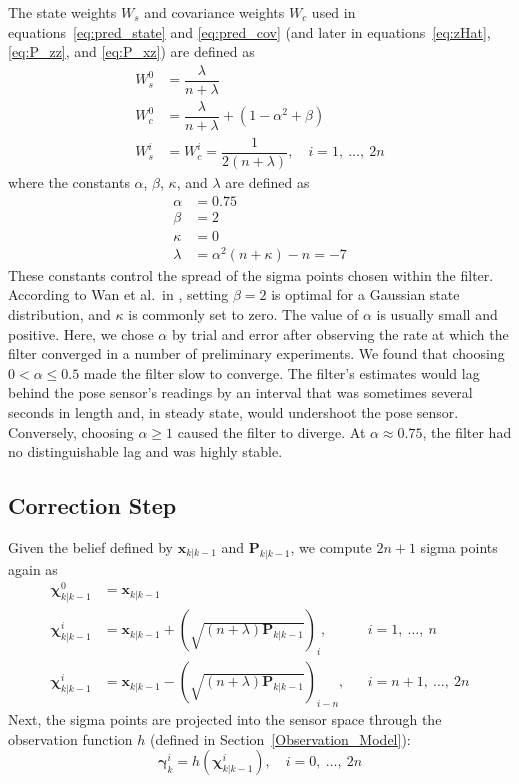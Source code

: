 The state weights $W_{s}$ and covariance weights $W_{c}$ used in equations~\ref{eq:pred_state} and \ref{eq:pred_cov} (and later in equations~\ref{eq:zHat}, \ref{eq:P_zz}, and \ref{eq:P_xz}) are defined as
%
\begin{align}
W^{0}_{s} &= \dfrac{\lambda}{n + \lambda} \nonumber \\
W^{0}_{c} &= \dfrac{\lambda}{n + \lambda} + \left( 1 - \alpha^{2} + \beta \right) \\
W^{i}_{s} &= W^{i}_{c} = \dfrac{1}{2 \left(n + \lambda \right)}, \quad i = 1,\ \dots,\ 2n \nonumber
\end{align}
%
where the constants $\alpha$, $\beta$, $\kappa$, and $\lambda$ are defined as
%
\begin{align}
\alpha &= 0.75 \\
\beta &= 2 \\
\kappa &= 0 \\
\lambda &= \alpha^{2} \left( n + \kappa \right) - n = -7
\end{align}
%
These constants control the spread of the sigma points chosen within the filter. According to Wan et al.\ in \cite{Wan2000}, setting $\beta = 2$ is optimal for a Gaussian state distribution, and $\kappa$ is commonly set to zero. The value of $\alpha$ is usually small and positive. Here, we chose $\alpha$ by trial and error after observing the rate at which the filter converged in a number of preliminary experiments. We found that choosing $0 < \alpha \leq 0.5$ made the filter slow to converge. The filter's estimates would lag behind the pose sensor's readings by an interval that was sometimes several seconds in length and, in steady state, would undershoot the pose sensor. Conversely, choosing $\alpha \geq 1$ caused the filter to diverge. At $\alpha \approx 0.75$, the filter had no distinguishable lag and was highly stable.

\subsection{Correction Step}

Given the belief defined by $\mathbf{x}_{k | k-1}$ and $\mathbf{P}_{k | k-1}$, we compute $2n + 1$ sigma points again as
%
\begin{align}
\bm{\chi}^{0}_{k | k-1} &= \mathbf{x}_{k | k-1} & \nonumber\\
\bm{\chi}^{i}_{k | k-1} &= \mathbf{x}_{k | k-1} + \left( \sqrt{\left( n + \lambda \right) \mathbf{P}_{k | k-1}} \right)_{i}, &&i = 1,\ \dots,\ n \\
\bm{\chi}^{i}_{k | k-1} &= \mathbf{x}_{k | k-1} - \left( \sqrt{\left( n + \lambda \right) \mathbf{P}_{k | k-1}} \right)_{i-n}, &&i = n+1,\ \dots,\ 2n \nonumber
\end{align}
%
Next, the sigma points are projected into the sensor space through the observation function $h$ (defined in Section~\ref{Observation_Model}):
%
\begin{equation}
\bm{\gamma}^{i}_{k} = h \left( \bm{\chi}^{i}_{k | k-1} \right), \quad i = 0,\ \dots,\ 2n
\end{equation}

